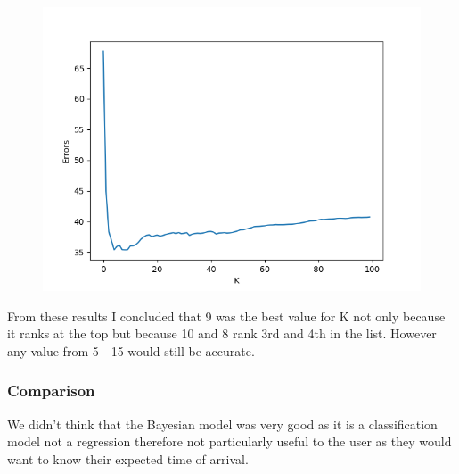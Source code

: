 \documentclass[11pt]{article}
\begin{document}
	\begin{figure}[!htb]
		\centering
		\begin{minipage}{.8\textwidth}
			\centering
			\includegraphics[width=.8\linewidth]{Resources/PartTwo/searchingForK_20220110_065714.png}
			\label{Img:KSearch}
		\end{minipage}%
		\begin{minipage}{.2\textwidth}
			\centering
			\label{Img:KSearchRaw}
		\end{minipage}
	\end{figure}
	
	From these results I concluded that 9 was the best value for K not only because it ranks at the top but because 10 and 8 rank 3rd and 4th in the list. However any value from 5 - 15 would still be accurate.
	\subsubsection{Comparison}
	We didn't think that the Bayesian model was very good as it is a classification model not a regression therefore not particularly useful to the user as they would want to know their expected time of arrival.
	
\end{document}
